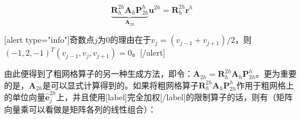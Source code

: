 \documentclass[12pt, UTF8, nofonts]{ctexart}
\begin{document}
\begin{equation}
  \label{eq:reseqcoarse}
  \underbrace{\boldsymbol{R}_{h}^{2h}\boldsymbol{A}_h\boldsymbol{P}_{2h}^{h}}_{\boldsymbol{A}_{2h}}\boldsymbol{u}^{2h} = \boldsymbol{R}_{h}^{2h}\boldsymbol{r}^h
\end{equation}

[alert type="info"]奇数点$j$为$0$的理由在于$v_{j}=(v_{j-1}+v_{j+1})/2$，则$(-1,2,-1)^T(v_{j-1},v_j,v_{j+1})=0$。[/alert]

由此便得到了粗网格算子的另一种生成方法，即令：$\boldsymbol{A}_{2h}=\boldsymbol{R}_{h}^{2h}\boldsymbol{A}_h\boldsymbol{P}_{2h}^{h}$。更为重要的是，$\boldsymbol{A}_{2h}$是可以显式计算得到的。如果将粗网格算子$\boldsymbol{R}_{h}^{2h}\boldsymbol{A}_h\boldsymbol{P}_{2h}^{h}$作用于粗网格上的单位向量$\hat{\boldsymbol{e}}_{j}^{2h}$上，并且使用[label]完全加权[/label]的限制算子的话，则有（矩阵向量乘可以看做是矩阵各列的线性组合）：
\end{document}
